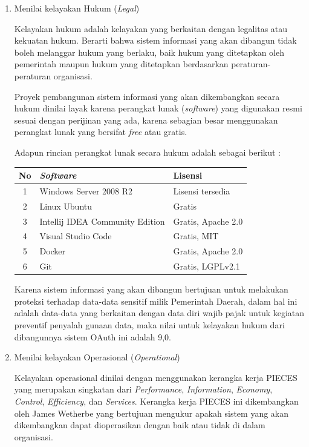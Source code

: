 \documentclass[pdftex,12pt, oneside]{article}
\begin{document}
\begin{enumerate}
\begin{enumerate}
\end{enumerate}
	
	\item Menilai kelayakan Hukum (\textit{Legal})
	
Kelayakan hukum adalah kelayakan yang berkaitan dengan legalitas atau kekuatan hukum. Berarti bahwa sistem informasi yang akan dibangun tidak boleh melanggar hukum yang berlaku, baik hukum yang ditetapkan oleh pemerintah maupun hukum yang ditetapkan berdasarkan peraturan-peraturan organisasi. 

Proyek pembangunan sistem informasi yang akan dikembangkan secara hukum dinilai layak karena perangkat lunak (\textit{software}) yang digunakan resmi sesuai dengan perijinan yang ada, karena sebagian besar menggunakan perangkat lunak yang bersifat \textit{free} atau gratis.

Adapun rincian perangkat lunak secara hukum adalah sebagai berikut :

\begin{table}[H]
\centering
\begin{tabular}{| c | l | l |}
	\hline
	No & \textit{Software} & Lisensi \\
	\hline
	1 & Windows Server 2008 R2 & Lisensi tersedia \\
	\hline
	2 & Linux Ubuntu & Gratis \\
	\hline
	3 & Intellij IDEA Community Edition & Gratis, Apache 2.0 \\
	\hline
	4 & Visual Studio Code & Gratis, MIT \\
	\hline
	5 & Docker & Gratis, Apache 2.0 \\
	\hline
	6 & Git & Gratis, LGPLv2.1 \\ 
	\hline
	
\end{tabular}
\end{table}

Karena sistem informasi yang akan dibangun bertujuan untuk melakukan proteksi terhadap data-data sensitif milik Pemerintah Daerah, dalam hal ini adalah data-data yang berkaitan dengan data diri wajib pajak untuk kegiatan preventif penyalah gunaan data, maka nilai untuk kelayakan hukum dari dibangunnya sistem OAuth ini adalah 9,0.

	\item Menilai kelayakan Operasional (\textit{Operational})
		
Kelayakan operasional dinilai dengan menggunakan kerangka kerja PIECES yang merupakan singkatan dari \textit{Performance}, \textit{Information}, \textit{Economy}, \textit{Control}, \textit{Efficiency}, dan \textit{Services}. Kerangka kerja PIECES ini dikembangkan oleh James Wetherbe yang bertujuan mengukur apakah sistem yang akan dikembangkan dapat dioperasikan dengan baik atau tidak di dalam organisasi.


\end{enumerate}
\end{document}
